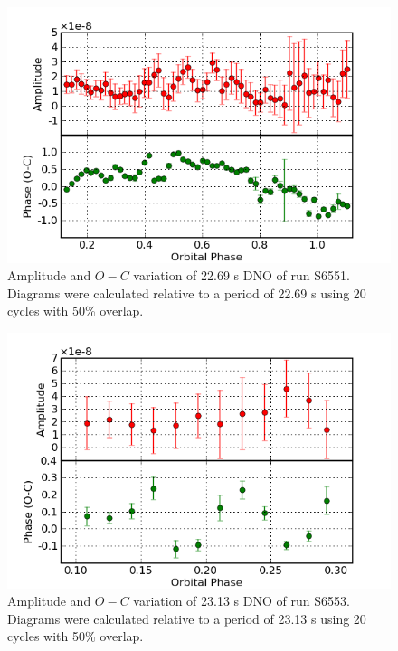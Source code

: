 \begin{figure}
 \centering
 \includegraphics[bb=0 0 600 400,width=0.85\columnwidth]{images/archive_phot/S6551/S6551d_22.69.png}
 \caption[S6551 $O-C$ diagram of DNO]{Amplitude and $O-C$ variation of 22.69 s DNO of run S6551. Diagrams were calculated relative to a period of 22.69 s using 20 cycles with 50\% overlap. }
 \label{S6551_22.69}
\end{figure}


\begin{figure}
 \centering
 \includegraphics[bb=0 0 600 400,width=0.85\columnwidth]{images/archive_phot/S6553/S6553d_23.13.png}
 \caption[S6553 $O-C$ diagram of DNO]{Amplitude and $O-C$ variation of 23.13 s DNO of run S6553. Diagrams were calculated relative to a period of 23.13 s using 20 cycles with 50\% overlap. }
 \label{S6553_23.13}
\end{figure}


